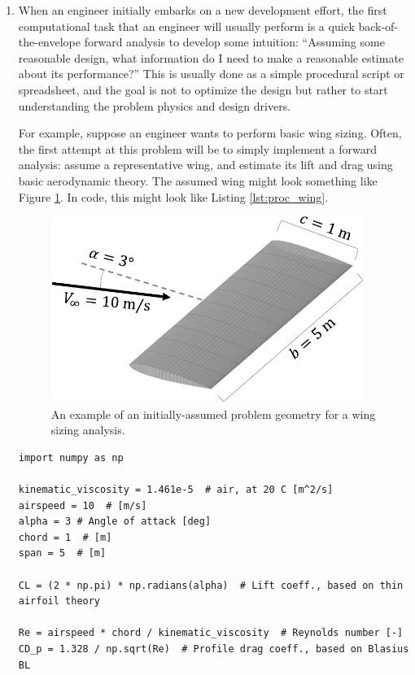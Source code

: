 \begin{enumerate}
    \item When an engineer initially embarks on a new development effort, the first computational task that an engineer will usually perform is a quick back-of-the-envelope forward analysis to develop some intuition: ``Assuming some reasonable design, what information do I need to make a reasonable estimate about its performance?'' This is usually done as a simple procedural script or spreadsheet, and the goal is not to optimize the design but rather to start understanding the problem physics and design drivers.

    For example, suppose an engineer wants to perform basic wing sizing. Often, the first attempt at this problem will be to simply implement a forward analysis: assume a representative wing, and estimate its lift and drag using basic aerodynamic theory. The assumed wing might look something like Figure \ref{fig:proc_wing}. In code, this might look like Listing \ref{lst:proc_wing}.

    \begin{figure}[H]
        \centering
        \includegraphics[width=4in]{../figures/wing_proc-crop.pdf}
        \caption{An example of an initially-assumed problem geometry for a wing sizing analysis.}
        \label{fig:proc_wing}
    \end{figure}

    \begin{listing}[H]
        \begin{verbatim}
import numpy as np

kinematic_viscosity = 1.461e-5  # air, at 20 C [m^2/s]
airspeed = 10  # [m/s]
alpha = 3 # Angle of attack [deg]
chord = 1  # [m]
span = 5  # [m]

CL = (2 * np.pi) * np.radians(alpha)  # Lift coeff., based on thin airfoil theory

Re = airspeed * chord / kinematic_viscosity  # Reynolds number [-]
CD_p = 1.328 / np.sqrt(Re)  # Profile drag coeff., based on Blasius BL


\end{verbatim}
\end{listing}
\end{enumerate}
